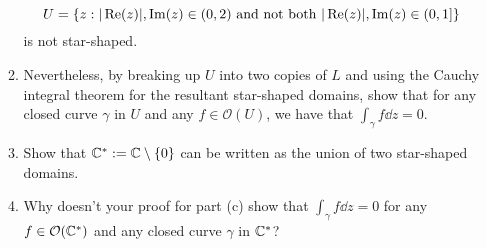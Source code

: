 \documentclass[../psets.tex]{subfiles}
\begin{document}
\begin{enumerate}[label={\textbf{\arabic*.}}]
\begin{enumerate}
        \begin{equation*}
            U = \{z:|\operatorname{Re}(z)|,\operatorname{Im}(z)\in(0,2)\text{ and not both }|\operatorname{Re}(z)|,\operatorname{Im}(z)\in(0,1]\}
        \end{equation*}
        is not star-shaped.
        \item Nevertheless, by breaking up $U$ into two copies of $L$ and using the Cauchy integral theorem for the resultant star-shaped domains, show that for any closed curve $\gamma$ in $U$ and any $f\in\mathcal{O}(U)$, we have that $\int_\gamma f\dd{z}=0$.
        \item Show that $\mathbb{C}^*:=\mathbb{C}\setminus\{0\}$ can be written as the union of two star-shaped domains.
        \item Why doesn't your proof for part (c) show that $\int_\gamma f\dd{z}=0$ for any $f\in\mathcal{O}(\mathbb{C}^*)$ and any closed curve $\gamma$ in $\mathbb{C}^*$?
    \end{enumerate}
\end{enumerate}
\end{document}
